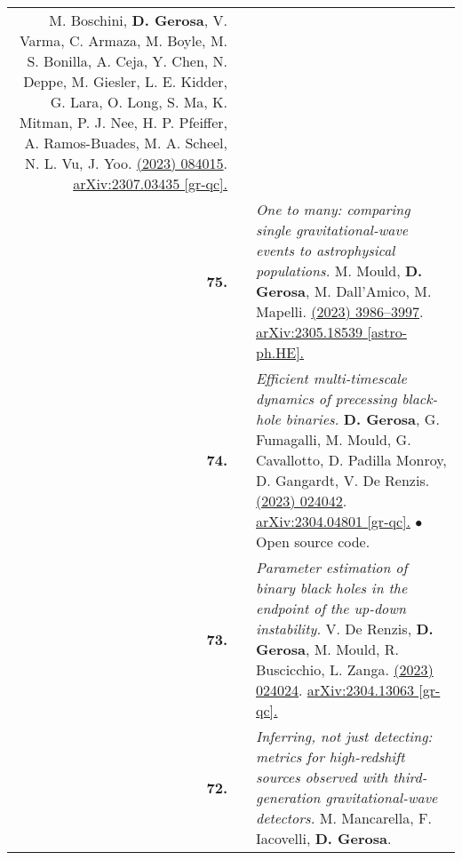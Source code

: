 {\begin{longtable}{rp{0.3cm}p{15.8cm}}
\newline{}
M. Boschini, \textbf{D. Gerosa}, V. Varma, C. Armaza, M. Boyle, M. S. Bonilla, A. Ceja, Y. Chen, N. Deppe, M. Giesler, L. E. Kidder, G. Lara, O. Long, S. Ma, K. Mitman, P. J. Nee, H. P. Pfeiffer, A. Ramos-Buades, M. A. Scheel, N. L. Vu, J. Yoo.
\newline{}
\href{https://journals.aps.org/prd/abstract/10.1103/PhysRevD.108.084015}{\prd 108 (2023) 084015}. \href{https://arxiv.org/abs/2307.03435}{arXiv:2307.03435 [gr-qc].}
\vspace{0.09cm}\\
%
\textbf{75.} & & \textit{One to many: comparing single gravitational-wave events to astrophysical populations.}
\newline{}
M. Mould, \textbf{D. Gerosa}, M. Dall'Amico, M. Mapelli.
\newline{}
\href{https://doi.org/10.1093/mnras/stad2502}{\mnras 525 (2023) 3986–3997}. \href{https://arxiv.org/abs/2305.18539}{arXiv:2305.18539 [astro-ph.HE].}
\vspace{0.09cm}\\
%
\textbf{74.} & & \textit{Efficient multi-timescale dynamics of precessing black-hole binaries.}
\newline{}
\textbf{D. Gerosa}, G. Fumagalli, M. Mould, G. Cavallotto, D. Padilla Monroy, D. Gangardt, V. De Renzis.
\newline{}
\href{https://journals.aps.org/prd/abstract/10.1103/PhysRevD.108.024042}{\prd 108 (2023) 024042}. \href{https://arxiv.org/abs/2304.04801}{arXiv:2304.04801 [gr-qc].}
\newline{}
\textcolor{color1}{$\bullet$} Open source code.
\vspace{0.09cm}\\
%
\textbf{73.} & & \textit{Parameter estimation of binary black holes in the endpoint of the up-down instability.}
\newline{}
V. De Renzis, \textbf{D. Gerosa}, M. Mould, R. Buscicchio, L. Zanga.
\newline{}
\href{https://journals.aps.org/prd/abstract/10.1103/PhysRevD.108.024024}{\prd 108 (2023) 024024}. \href{https://arxiv.org/abs/2304.13063}{arXiv:2304.13063 [gr-qc].}
\vspace{0.09cm}\\
%
\textbf{72.} & & \textit{Inferring, not just detecting: metrics for high-redshift sources observed with third-generation gravitational-wave detectors.}
\newline{}
M. Mancarella, F. Iacovelli, \textbf{D. Gerosa}.

\end{longtable}}
